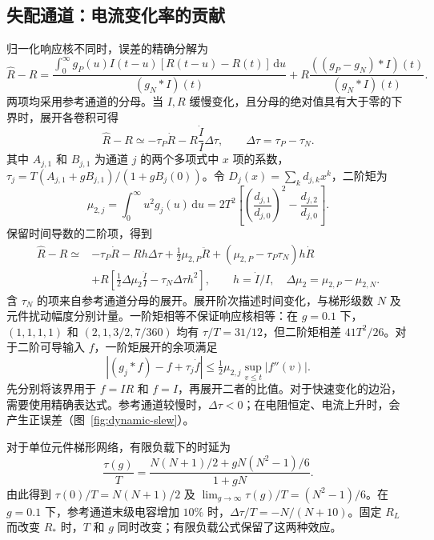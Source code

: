 \subsection{失配通道：电流变化率的贡献}
\label{sec:dynamic-mismatch}

归一化响应核不同时，误差的精确分解为
\begin{equation}\label{eq:dynamic-decomposition}
\hat R-R=\frac{\displaystyle\int_0^\infty g_P(u)I(t-u)[R(t-u)-R(t)]\,\mathrm du}{(g_N\ast I)(t)}
+R\frac{((g_P-g_N)\ast I)(t)}{(g_N\ast I)(t)}.
\end{equation}
两项均采用参考通道的分母。当 $I,R$ 缓慢变化，且分母的绝对值具有大于零的下界时，展开各卷积可得
\begin{equation}\label{eq:mismatch-dynamic}
\hat R-R\simeq-\tau_P\dot R-R\frac{\dot I}{I}\Delta\tau,
\qquad \Delta\tau=\tau_P-\tau_N.
\end{equation}
其中 $A_{j,1}$ 和 $B_{j,1}$ 为通道 $j$ 的两个多项式中 $x$ 项的系数，$\tau_j=T(A_{j,1}+gB_{j,1})/(1+gB_j(0))$。令 $D_j(x)=\sum_k d_{j,k}x^k$，二阶矩为
\begin{equation}\label{eq:second-moment}
\mu_{2,j}=\int_0^\infty u^2g_j(u)\,\mathrm du
=2T^2\left[\left(\frac{d_{j,1}}{d_{j,0}}\right)^2-\frac{d_{j,2}}{d_{j,0}}\right].
\end{equation}
保留时间导数的二阶项，得到
\begin{equation}\label{eq:second-order-ratio}
\begin{aligned}
\hat R-R\simeq{}&-\tau_P\dot R-Rh\Delta\tau+\tfrac12\mu_{2,P}\ddot R
+(\mu_{2,P}-\tau_P\tau_N)h\dot R\\
&+R\left[\tfrac12\Delta\mu_2\frac{\ddot I}{I}-\tau_N\Delta\tau h^2\right],
\qquad h=\dot I/I,\quad\Delta\mu_2=\mu_{2,P}-\mu_{2,N}.
\end{aligned}
\end{equation}
含 $\tau_N$ 的项来自参考通道分母的展开。展开阶次描述时间变化，与梯形级数 $N$ 及元件扰动幅度分别计量。一阶矩相等不保证响应核相等：在 $g=0.1$ 下，$(1,1,1,1)$ 和 $(2,1,3/2,7/360)$ 均有 $\tau/T=31/12$，但二阶矩相差 $41T^2/26$。对于二阶可导输入 $f$，一阶矩展开的余项满足
\begin{equation}\label{eq:dynamic-remainder}
|(g_j\ast f)-f+\tau_j\dot f|
\le\tfrac12\mu_{2,j}\sup_{v\le t}|f''(v)|.
\end{equation}
先分别将该界用于 $f=IR$ 和 $f=I$，再展开二者的比值。对于快速变化的边沿，需要使用精确表达式。参考通道较慢时，$\Delta\tau<0$；在电阻恒定、电流上升时，会产生正误差（图~\ref{fig:dynamic-slew}）。

对于单位元件梯形网络，有限负载下的时延为
\begin{equation}\label{eq:unit-delay}
\frac{\tau(g)}T=\frac{N(N+1)/2+gN(N^2-1)/6}{1+gN}.
\end{equation}
由此得到 $\tau(0)/T=N(N+1)/2$ 及 $\lim_{g\to\infty}\tau(g)/T=(N^2-1)/6$。在 $g=0.1$ 下，参考通道末级电容增加 $10\%$ 时，$\Delta\tau/T=-N/(N+10)$。固定 $R_L$ 而改变 $R_*$ 时，$T$ 和 $g$ 同时改变；有限负载公式保留了这两种效应。


